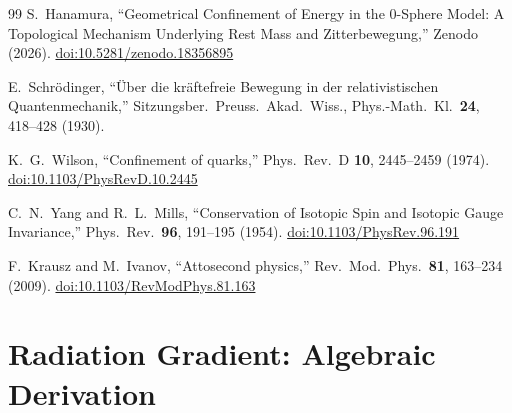 \documentclass[%
 reprint, amsmath,amssymb, aps, prb, ]{revtex4-2}
\numberwithin{equation}{section}
\begin{document}
\begin{thebibliography}{99}
S.~Hanamura, ``Geometrical Confinement of Energy in the 0-Sphere Model: A Topological Mechanism Underlying Rest Mass and Zitterbewegung,'' Zenodo (2026). \href{https://doi.org/10.5281/zenodo.18356895}{doi:10.5281/zenodo.18356895}

E.~Schr\"odinger, ``\"Uber die kr\"aftefreie Bewegung in der relativistischen Quantenmechanik,'' Sitzungsber.\ Preuss.\ Akad.\ Wiss., Phys.-Math.\ Kl.\ \textbf{24}, 418--428 (1930).

K.~G.~Wilson, ``Confinement of quarks,'' Phys.\ Rev.\ D \textbf{10}, 2445--2459 (1974). \href{https://doi.org/10.1103/PhysRevD.10.2445}{doi:10.1103/PhysRevD.10.2445}

C.~N.~Yang and R.~L.~Mills, ``Conservation of Isotopic Spin and Isotopic Gauge Invariance,'' Phys.\ Rev.\ \textbf{96}, 191--195 (1954). \href{https://doi.org/10.1103/PhysRev.96.191}{doi:10.1103/PhysRev.96.191}

F.~Krausz and M.~Ivanov, ``Attosecond physics,'' Rev.\ Mod.\ Phys.\ \textbf{81}, 163--234 (2009). \href{https://doi.org/10.1103/RevModPhys.81.163}{doi:10.1103/RevModPhys.81.163}

\end{thebibliography}

\appendix

\section{Radiation Gradient: Algebraic Derivation}
\label{app:algebra}
\end{document}
